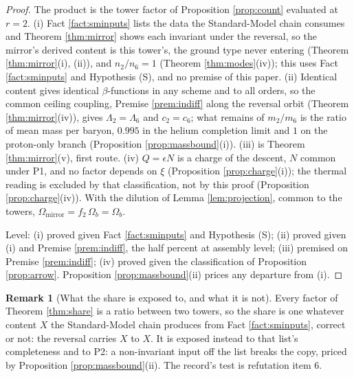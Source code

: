 \documentclass[11pt]{article}
\theoremstyle{definition}
\newtheorem{remark}[theorem]{Remark}
\begin{document}
\begin{proof}
The product is the tower factor of Proposition \ref{prop:count} evaluated at $r = 2$. (i) Fact \ref{fact:sminputs} lists the data the Standard-Model chain consumes and Theorem \ref{thm:mirror} shows each invariant under the reversal, so the mirror's derived content is this tower's, the ground type never entering (Theorem \ref{thm:mirror}(i), (ii)), and $n_{2}/n_{6} = 1$ (Theorem \ref{thm:modes}(iv)); this uses Fact \ref{fact:sminputs} and Hypothesis (S), and no premise of this paper. (ii) Identical content gives identical $\beta$-functions in any scheme and to all orders, so the common ceiling coupling, Premise \ref{prem:indiff} along the reversal orbit (Theorem \ref{thm:mirror}(iv)), gives $\Lambda_{2} = \Lambda_{6}$ and $c_{2} = c_{6}$; what remains of $m_{2}/m_{6}$ is the ratio of mean mass per baryon, $0.995$ in the helium completion limit and $1$ on the proton-only branch (Proposition \ref{prop:massbound}(i)). (iii) is Theorem \ref{thm:mirror}(v), first route. (iv) $Q = \epsilon N$ is a charge of the descent, $N$ common under P1, and no factor depends on $\xi$ (Proposition \ref{prop:charge}(i)); the thermal reading is excluded by that classification, not by this proof (Proposition \ref{prop:charge}(iv)). With the dilution of Lemma \ref{lem:projection}, common to the towers, $\Omega_{\mathrm{mirror}} = f_{2}\,\Omega_{b} = \Omega_{b}$.

Level: (i) proved given Fact \ref{fact:sminputs} and Hypothesis (S); (ii) proved given (i) and Premise \ref{prem:indiff}, the half percent at assembly level; (iii) premised on Premise \ref{prem:indiff}; (iv) proved given the classification of Proposition \ref{prop:arrow}. Proposition \ref{prop:massbound}(ii) prices any departure from (i).
\end{proof}

\begin{remark}[What the share is exposed to, and what it is not]\label{rem:shareexposure}
Every factor of Theorem \ref{thm:share} is a ratio between two towers, so the share is one whatever content $X$ the Standard-Model chain produces from Fact \ref{fact:sminputs}, correct or not: the reversal carries $X$ to $X$. It is exposed instead to that list's completeness and to P2: a non-invariant input off the list breaks the copy, priced by Proposition \ref{prop:massbound}(ii). The record's test is refutation item 6.
\end{remark}
\end{document}
